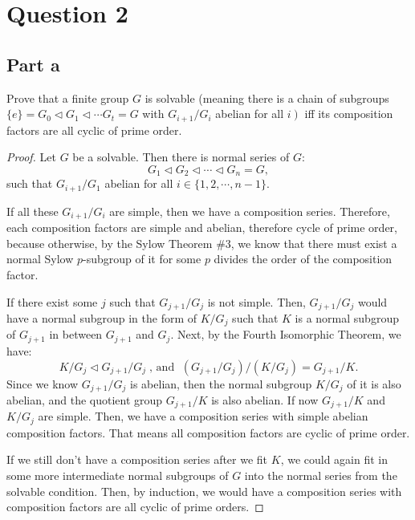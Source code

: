 \section{Question 2}

\subsection{Part a}

\begin{question}
    Prove that a finite group $G$ is solvable (meaning there is a chain of subgroups $\{e\}=G_0 \triangleleft G_1 \triangleleft \cdots G_t=G$ with $G_{i+1} / G_i$ abelian for all $\left.i\right)$ iff its composition factors are all cyclic of prime order.
\end{question}

\begin{answer}
    \begin{proof}
        Let $G$ be a solvable. Then there is normal series of $G$:
        \begin{equation}
            G_1 \triangleleft G_2 \triangleleft \cdots \triangleleft G_n = G,
        \end{equation}
        such that $G_{i+1}/G_1$ abelian for all $i \in \{1,2,\cdots,n-1\}$. 
        
        If all these $G_{i+1}/G_i$ are simple, then we have a composition series. Therefore, each composition factors are simple and abelian, therefore cycle of prime order, because otherwise, by the Sylow Theorem \#3, we know that there must exist a normal Sylow $p$-subgroup of it for some $p$ divides the order of the composition factor.
        
        If there exist some $j$ such that $G_{j+1}/G_j$ is not simple. Then, $G_{j+1}/G_j$ would have a normal subgroup in the form of $K/G_j$ such that $K$ is a normal subgroup of $G_{j+1}$ in between $G_{j+1}$ and $G_j$. Next, by the Fourth Isomorphic Theorem, we have:
        \begin{equation}
            K/G_j \triangleleft G_{j+1}/G_j\;\text{, and }\; (G_{j+1}/G_j)/(K/G_j) = G_{j+1}/K.
        \end{equation}
        Since we know $G_{j+1}/G_j$ is abelian, then the normal subgroup $K/G_j$ of it is also abelian, and the quotient group $G_{j+1}/K$ is also abelian. If now $G_{j+1}/K$ and $K/G_{j}$ are simple. Then, we have a composition series with simple abelian composition factors. That means all composition factors are cyclic of prime order.
        
        If we still don't have a composition series after we fit $K$, we could again fit in some more intermediate normal subgroups of $G$ into the normal series from the solvable condition. Then, by induction, we would have a composition series with composition factors are all cyclic of prime orders.
    \end{proof}
\end{answer}

